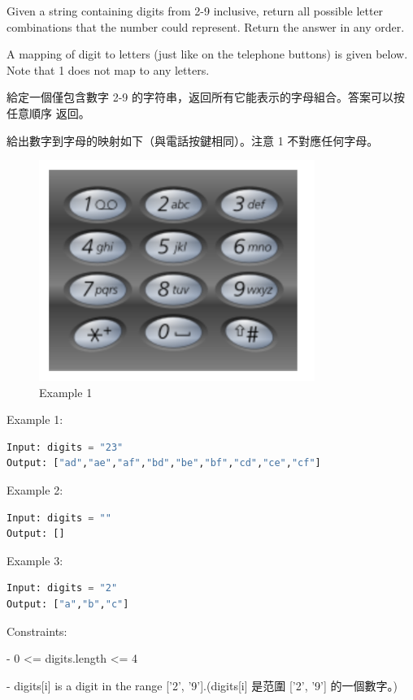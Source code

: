 \documentclass[10pt,UTF8]{ctexart}
\begin{document}
Given a string containing digits from 2-9 inclusive, return all possible letter combinations that the number could represent. Return the answer in any order.

A mapping of digit to letters (just like on the telephone buttons) is given below. Note that 1 does not map to any letters.

給定一個僅包含數字 2-9 的字符串，返回所有它能表示的字母組合。答案可以按 任意順序 返回。

給出數字到字母的映射如下（與電話按鍵相同）。注意 1 不對應任何字母。

\begin{figure}[H]
\centering 
\includegraphics[width=0.80\textwidth]{lc-16-p-example.png} 
\caption{Example 1}
\label{Test}
\end{figure}

Example 1:
\begin{lstlisting}[language={python}]
Input: digits = "23"
Output: ["ad","ae","af","bd","be","bf","cd","ce","cf"]
\end{lstlisting}

Example 2:
\begin{lstlisting}[language={python}]
Input: digits = ""
Output: []
\end{lstlisting}

Example 3:
\begin{lstlisting}[language={python}]
Input: digits = "2"
Output: ["a","b","c"]
\end{lstlisting}


Constraints:

- 0 <= digits.length <= 4

- digits[i] is a digit in the range ['2', '9'].(digits[i] 是范圍 ['2', '9'] 的一個數字。)
\end{document}
